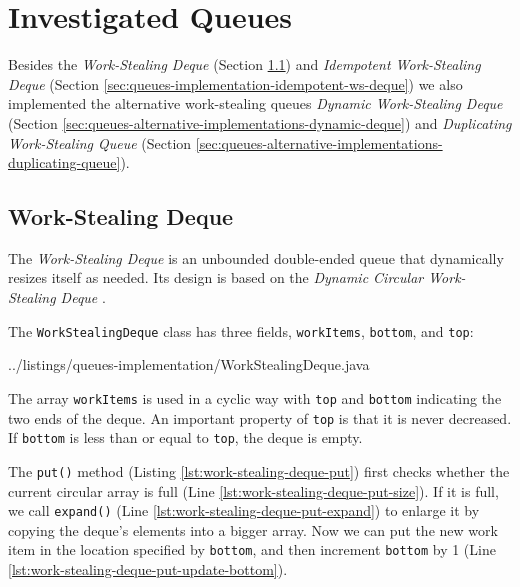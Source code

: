 
\chapter{Investigated Queues}
\label{chap:queues-implementation}

Besides the \emph{Work-Stealing Deque} (Section
\ref{sec:queues-implementation-ws-deque}) and \emph{Idempotent
  Work-Stealing Deque} (Section
\ref{sec:queues-implementation-idempotent-ws-deque}) we also
implemented the alternative work-stealing queues \emph{Dynamic
  Work-Stealing Deque} (Section
\ref{sec:queues-alternative-implementations-dynamic-deque}) and
\emph{Duplicating Work-Stealing Queue} (Section
\ref{sec:queues-alternative-implementations-duplicating-queue}).

\section{Work-Stealing Deque}
\label{sec:queues-implementation-ws-deque}

The \emph{Work-Stealing Deque} is an unbounded double-ended queue that
dynamically resizes itself as needed. Its design is based on the
\emph{Dynamic Circular Work-Stealing Deque} \cite{Chase2005, Lev2005}.

The \lstinline!WorkStealingDeque! class has three fields,
\lstinline!workItems!, \lstinline!bottom!, and \lstinline!top!:


{
    ../listings/queues-implementation/WorkStealingDeque.java
}

The array \lstinline!workItems! is used in a cyclic way with
\lstinline!top! and \lstinline!bottom! indicating the two ends of the
deque. An important property of \lstinline!top! is that it is never
decreased. If \lstinline!bottom! is less than or equal to
\lstinline!top!, the deque is empty.

The \lstinline!put()! method (Listing
\ref{lst:work-stealing-deque-put}) first checks whether the current
circular array is full (Line
\ref{lst:work-stealing-deque-put-size}). If it is full, we call
\lstinline!expand()! (Line \ref{lst:work-stealing-deque-put-expand})
to enlarge it by copying the deque's elements into a bigger array. Now
we can put the new work item in the location specified by
\lstinline!bottom!, and then increment \lstinline!bottom! by 1 (Line
\ref{lst:work-stealing-deque-put-update-bottom}).

